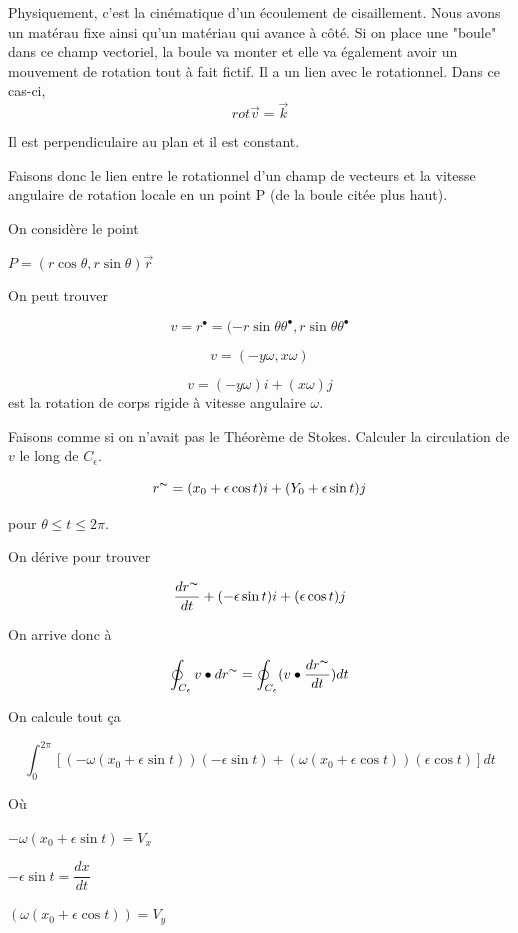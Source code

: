 Physiquement, c'est la cinématique d'un écoulement de cisaillement. Nous avons un matérau fixe ainsi qu'un matériau qui avance à côté.
Si on place une "boule" dans ce champ vectoriel, la boule va monter et elle va également avoir un mouvement de rotation tout à fait fictif. Il a un lien avec le rotationnel. Dans ce cas-ci,\[rot \vec v = \vec k\]

Il est perpendiculaire au plan et il est constant.

Faisons donc le lien entre le rotationnel d'un champ de vecteurs et la vitesse angulaire de rotation locale en un point P (de la boule citée plus haut).

On considère le point


$P = ( r \cos \theta, r \sin \theta ) \vec r $

On peut trouver

\[ v = r^{\bullet} = (-r\sin \theta \theta^{\bullet}, r\sin \theta \theta^{\bullet}\]

\[v = (-y \omega , x \omega) \]

\[v=(-y\omega) i + (x\omega) j \] est la rotation de corps rigide à vitesse angulaire $\omega$.

Faisons comme si on n'avait pas le Théorème de Stokes. Calculer la circulation de $v$ le long de $C_{\epsilon}$.

$$r^{\thicksim} = (x_0+ \epsilon \cos t ) i +( Y_0 + \epsilon \sin t )j $$

pour $\theta \le t \le 2 \pi$.

On dérive pour trouver

\[\frac{d r^{\thicksim} }{dt} + ( -\epsilon \sin t ) i + ( \epsilon \cos t ) j\]

On arrive donc à

\[\oint_{C_{\epsilon}} v \bullet dr^{\thicksim} = \oint_{C_{\epsilon}} ( v \bullet \frac{dr^{\thicksim}}{dt} ) dt \]


On calcule tout ça

\[\int_0^{2\pi} \left[ (-\omega ( x_0 + \epsilon \sin t )) ( - \epsilon \sin t ) + (\omega ( x_0 + \epsilon \cos t))( \epsilon \cos t ) \right] dt \]

Où

$-\omega ( x_0 + \epsilon \sin t ) = V_x$



$- \epsilon \sin t  = \dfrac{dx}{dt}$



$(\omega ( x_0 + \epsilon \cos t)) = V_y$




